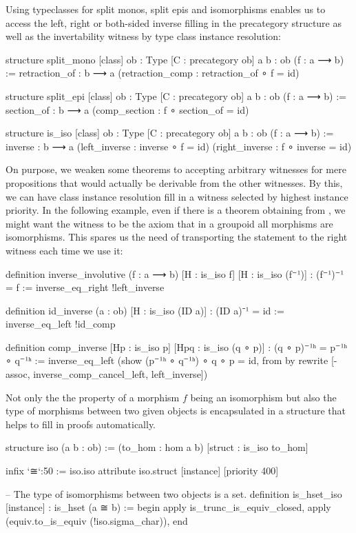 Using typeclasses for split monos, split epis and isomorphisms enables us to access
the left, right or both-sided inverse filling in the precategory structure as
well as the invertability witness by type class instance resolution:
\begin{leancode}
structure split_mono [class]
    {ob : Type} [C : precategory ob] {a b : ob} (f : a ⟶ b) :=
  {retraction_of : b ⟶ a}
  (retraction_comp : retraction_of ∘ f = id)

structure split_epi [class]
    {ob : Type} [C : precategory ob] {a b : ob} (f : a ⟶ b) :=
  {section_of : b ⟶ a}
  (comp_section : f ∘ section_of = id)

structure is_iso [class]
    {ob : Type} [C : precategory ob] {a b : ob} (f : a ⟶ b) :=
  {inverse : b ⟶ a}
  (left_inverse  : inverse ∘ f = id)
  (right_inverse : f ∘ inverse = id)
\end{leancode}

On purpose, we weaken some theorems to accepting arbitrary witnesses for mere propositions
that would actually be derivable from the other witnesses.
By this, we can have class instance resolution fill in a witness selected by
highest instance priority.
In the following example, even if there is a theorem obtaining 
from , we might want the witness to be the axiom that in a groupoid
all morphisms are isomorphisms.
This spares us the need of transporting the statement to the right witness each
time we use it:
\begin{leancode}
definition inverse_involutive (f : a ⟶ b) [H : is_iso f] [H : is_iso (f⁻¹)]
  : (f⁻¹)⁻¹ = f :=
inverse_eq_right !left_inverse

definition id_inverse (a : ob) [H : is_iso (ID a)] : (ID a)⁻¹ = id :=
inverse_eq_left !id_comp

definition comp_inverse [Hp : is_iso p] [Hpq : is_iso (q ∘ p)] :
  (q ∘ p)⁻¹ʰ = p⁻¹ʰ ∘ q⁻¹ʰ :=
inverse_eq_left (show (p⁻¹ʰ ∘ q⁻¹ʰ) ∘ q ∘ p = id, from
  by rewrite [-assoc, inverse_comp_cancel_left, left_inverse])
\end{leancode}

Not only the the property of a morphism $f$ being an isomorphism but also the type
of morphisms between two given objects is encapsulated in a structure that
helps to fill in proofs automatically. %
\begin{leancode}
structure iso (a b : ob) :=
  (to_hom : hom a b)
  [struct : is_iso to_hom]

infix `≅`:50 := iso.iso
attribute iso.struct [instance] [priority 400]

-- The type of isomorphisms between two objects is a set.
definition is_hset_iso [instance] : is_hset (a ≅ b) :=
begin
  apply is_trunc_is_equiv_closed,
    apply (equiv.to_is_equiv (!iso.sigma_char)),
end
\end{leancode}

